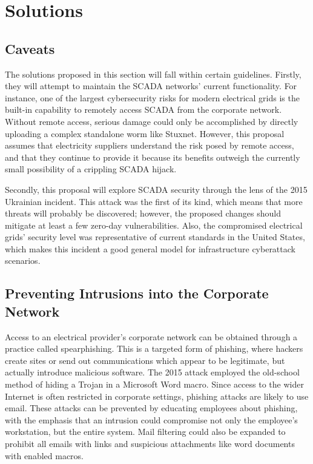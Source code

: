 \documentclass[10pt]{article}
\begin{document}
    \section{Solutions}
    \subsection{Caveats}
    The solutions proposed in this section will fall within certain guidelines. Firstly, they will attempt to maintain the SCADA networks' current functionality. For instance, one of the largest cybersecurity risks for modern electrical grids is the built-in capability to remotely access SCADA from the corporate network. Without remote access, serious damage could only be accomplished by directly uploading a complex standalone worm like Stuxnet. However, this proposal assumes that electricity suppliers understand the risk posed by remote access, and that they continue to provide it because its benefits outweigh the currently small possibility of a crippling SCADA hijack.
    \medskip
    
    Secondly, this proposal will explore SCADA security through the lens of the 2015 Ukrainian incident. This attack was the first of its kind, which means that more threats will probably be discovered; however, the proposed changes should mitigate at least a few zero-day vulnerabilities. Also, the compromised electrical grids' security level was representative of current standards in the United States,\cite{wiredshort} which makes this incident a good general model for infrastructure cyberattack scenarios.
    
    \subsection{Preventing Intrusions into the Corporate Network}
    Access to an electrical provider's corporate network can be obtained through a practice called spearphishing. This is a targeted form of phishing, where hackers create sites or send out communications which appear to be legitimate, but actually introduce malicious software. The 2015 attack employed the old-school method of hiding a Trojan in a Microsoft Word macro.\cite{wiredshort} Since access to the wider Internet is often restricted in corporate settings, phishing attacks are likely to use email. These attacks can be prevented by educating employees about phishing, with the emphasis that an intrusion could compromise not only the employee's workstation, but the entire system. Mail filtering could also be expanded to prohibit all emails with links and suspicious attachments like word documents with enabled macros.
    \medskip
    
\end{document}
